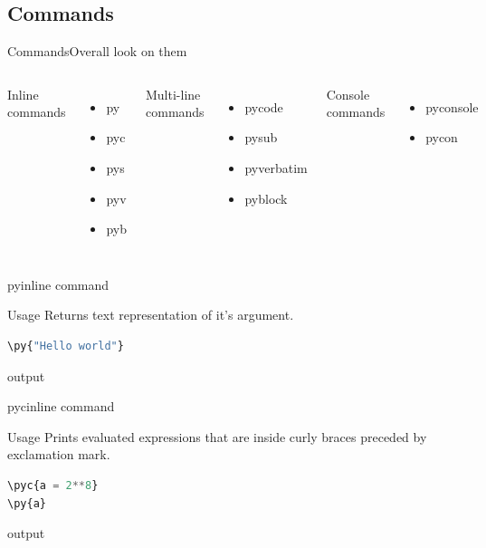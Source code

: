 \documentclass[
aspectratio=1610,
hyperref={pdfpagemode=FullScreen},
english,
usenames,
dvipsnames
]
{beamer} %
\begin{document}
\subsection{Commands}
  \begin{frame}{Commands}{Overall look on them}
  	\begin{columns}
  	Inline commands
  	\begin{itemize}
  		\item py
  		\item pyc
  		\item pys
  		\item pyv
  		\item pyb
  	\end{itemize}
  	Multi-line commands
  	\begin{itemize}
  		\item pycode
  		\item pysub
  		\item pyverbatim
  		\item pyblock
  	\end{itemize}
  	Console commands
  	\begin{itemize}
  		\item pyconsole
  		\item pycon
  	\end{itemize}
  	\onslide
  	\end{columns}
  \end{frame}
  \begin{frame}[fragile]{py}{inline command}
  
  \begin{block}{Usage}
  	Returns text representation  of it's argument.
  \end{block}
  
  \begin{lstlisting}[language=python]
	\py{"Hello world"}
  \end{lstlisting}
  
  	\begin{exampleblock}{output}
    \onslide
	\end{exampleblock}
  
  \end{frame}
  
  \begin{frame}[fragile]{pyc}{inline command}
  
  \begin{block}{Usage}
  	Prints evaluated expressions that are inside curly braces preceded by exclamation mark.
  \end{block}
  
  \begin{lstlisting}[language=python]
\pyc{a = 2**8}
\py{a}
  \end{lstlisting}
  
  	\begin{exampleblock}{output}
    \onslide
	\end{exampleblock}
  
  \end{frame}
  
\end{document}
